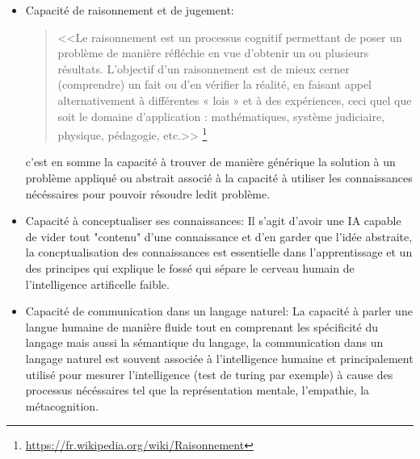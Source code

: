 \begin{itemize}
    \item Capacité de raisonnement et de jugement:
    \begin{quotation}
        <<Le raisonnement est un processus cognitif permettant
        de poser un problème de manière réfléchie en vue d'obtenir un ou plusieurs résultats.
        L'objectif d'un raisonnement est de mieux cerner (comprendre) un fait ou d'en vérifier la réalité,
        en faisant appel alternativement à différentes « lois » et à des expériences,
        ceci quel que soit le domaine d'application : mathématiques, système judiciaire,
        physique, pédagogie, etc.>>
        \footnote{\url{https://fr.wikipedia.org/wiki/Raisonnement}}
    \end{quotation}

    c'est en somme la capacité à trouver de manière générique la solution à un problème appliqué
    ou abstrait associé à la capacité à utiliser les connaissances nécéssaires pour pouvoir
    résoudre ledit problème.
    \newline

    \item Capacité à conceptualiser ses connaissances: \newline
    Il s'agit d'avoir une IA capable de vider tout "contenu" d'une connaissance et d'en garder
    que l'idée abstraite, la concptualisation des connaissances est essentielle dans l'apprentissage
    et un des principes qui explique le fossé qui sépare le cerveau humain de l'intelligence
    artificelle faible. %
    \newline


    \item Capacité de communication dans un langage naturel: \newline
    La capacité à parler une langue humaine de manière fluide
    tout en comprenant les spécificité du langage mais aussi la sémantique du langage,
    la communication dans un langage naturel est souvent associée à l'intelligence humaine
    et principalement utilisé pour mesurer l'intelligence (test de turing par exemple)
    à cause des processus nécéssaires tel que la représentation mentale, l'empathie,
    la métacognition.
    \newline



\end{itemize}
